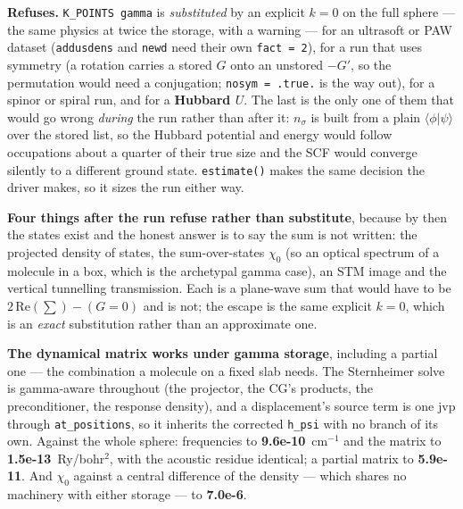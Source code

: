\documentclass[11pt,a4paper]{article}
\newcommand{\code}[1]{\texttt{\small #1}}
\begin{document}
\begin{refuses}
\textbf{Refuses.} \code{K\_POINTS gamma} is \emph{substituted} by an explicit
$k=0$ on the full sphere --- the same physics at twice the storage, with a
warning --- for an ultrasoft or PAW dataset (\code{addusdens} and \code{newd}
need their own \code{fact = 2}), for a run that uses symmetry (a rotation
carries a stored $G$ onto an unstored $-G'$, so the permutation would need a
conjugation; \code{nosym = .true.} is the way out), for a spinor or spiral run,
and for a \textbf{Hubbard $U$}. The last is the only one of them that would go
wrong \emph{during} the run rather than after it: $n_{\sigma}$ is built from a
plain $\langle \phi | \psi \rangle$ over the stored list, so the Hubbard
potential and energy would follow occupations about a quarter of their true
size and the SCF would converge silently to a different ground state.
\code{estimate()} makes the same decision the driver makes, so it sizes
the run either way.

\textbf{Four things after the run refuse rather than substitute}, because by
then the states exist and the honest answer is to say the sum is not written:
the projected density of states, the sum-over-states $\chi_0$ (so an optical
spectrum of a molecule in a box, which is the archetypal gamma case), an STM
image and the vertical tunnelling transmission. Each is a plane-wave sum that
would have to be $2\,\mathrm{Re}(\sum) - (G{=}0)$ and is not; the escape is the
same explicit $k=0$, which is an \emph{exact} substitution rather than an
approximate one.

\textbf{The dynamical matrix works under gamma storage}, including a partial
one --- the combination a molecule on a fixed slab needs. The Sternheimer solve
is gamma-aware throughout (the projector, the CG's products, the
preconditioner, the response density), and a displacement's source term is one
$\mathrm{jvp}$ through \code{at\_positions}, so it inherits the corrected
\code{h\_psi} with no branch of its own. Against the whole sphere: frequencies
to \textbf{9.6e-10}~cm$^{-1}$ and the matrix to \textbf{1.5e-13}~Ry/bohr$^2$,
with the acoustic residue identical; a partial matrix to \textbf{5.9e-11}. And
$\chi_0$ against a central difference of the density --- which shares no
machinery with either storage --- to \textbf{7.0e-6}.


\end{refuses}
\end{document}

